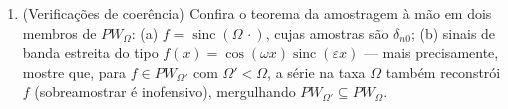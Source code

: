 \begin{problem}[{Problema de fim de semana --- $\partial_tu =
\partial^2_{xx}u$, resolvida de
ponta a ponta}]
\begin{enumerate}[resume]
        regra de engenharia: um sinal de banda limitada a $\Omega$
        cuja energia é essencialmente carregada por uma janela temporal
        de comprimento $T$ é descrito por aproximadamente $\frac{\Omega T}\pi$
        amostras reais --- torne ``essencialmente'' preciso por meio da
        identidade de energia e da cauda $\sum_{\abs{n\pi/\Omega} >
        T/2}$.
  \item (Verificações de coerência) Confira o teorema da amostragem à
        mão em dois membros de $PW_\Omega$: (a) $f =
        \operatorname{sinc}(\Omega\,\cdot)$, cujas amostras são
        $\delta_{n0}$; (b) sinais de banda estreita do tipo $f(x) = \cos(\omega x)
        \operatorname{sinc}(\varepsilon x)$ --- mais
        precisamente, mostre que, para $f \in
        PW_{\Omega'}$ com $\Omega' < \Omega$, a série na taxa
        $\Omega$ também reconstrói $f$ (sobreamostrar é
        inofensivo), mergulhando $PW_
        {\Omega'} \subseteq PW_\Omega$.
\end{enumerate}


\end{problem}
